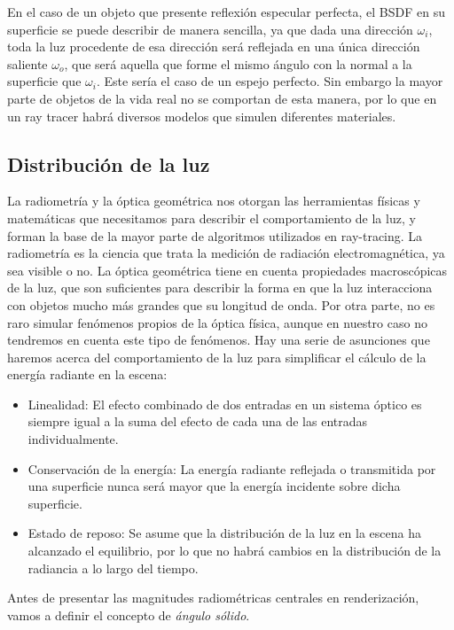 En el caso de un objeto que presente reflexión especular perfecta, el BSDF en su superficie se puede describir de manera sencilla, ya que dada una dirección $\omega _i$, toda la luz procedente de esa dirección será reflejada en una única dirección saliente $\omega _o$, que será aquella que forme el mismo ángulo con la normal a la superficie que $\omega _i$. Este sería el caso de un espejo perfecto. Sin embargo la mayor parte de objetos de la vida real no se comportan de esta manera, por lo que en un ray tracer habrá diversos modelos que simulen diferentes materiales.

\subsection{Distribución de la luz}

La radiometría y la óptica geométrica nos otorgan las herramientas físicas y matemáticas que necesitamos para describir el comportamiento de la luz, y forman la base de la mayor parte de algoritmos utilizados en ray-tracing. La radiometría es la ciencia que trata la medición de radiación electromagnética, ya sea visible o no. La óptica geométrica tiene en cuenta propiedades macroscópicas de la luz, que son suficientes para describir la forma en que la luz interacciona con objetos mucho más grandes que su longitud de onda. Por otra parte, no es raro simular fenómenos propios de la óptica física, aunque en nuestro caso no tendremos en cuenta este tipo de fenómenos. Hay una serie de asunciones que haremos acerca del comportamiento de la luz para simplificar el cálculo de la energía radiante en la escena:

\begin{itemize}
\item Linealidad: El efecto combinado de dos entradas en un sistema óptico es siempre igual a la suma del efecto de cada una de las entradas individualmente.
\item Conservación de la energía: La energía radiante reflejada o transmitida por una superficie nunca será mayor que la energía incidente sobre dicha superficie.
  \item Estado de reposo: Se asume que la distribución de la luz en la escena ha alcanzado el equilibrio, por lo que no habrá cambios en la distribución de la radiancia a lo largo del tiempo.
\end{itemize}

Antes de presentar las magnitudes radiométricas centrales en renderización, vamos a definir el concepto de \emph{ángulo sólido}.

